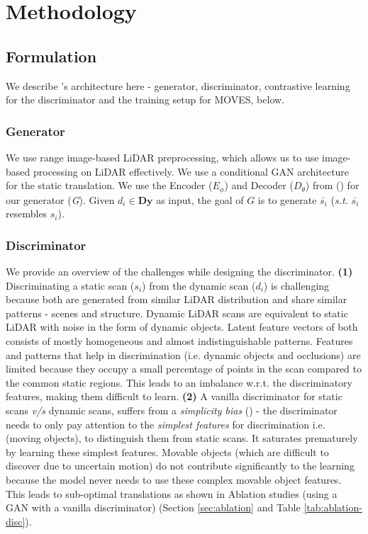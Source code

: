\section{Methodology}
\subsection{\dslr{} Formulation}
We describe \dslr{}'s architecture here - generator, discriminator, contrastive learning for the discriminator and the training setup for MOVES, below.
\subsubsection{Generator}
We use range image-based LiDAR preprocessing, which allows us to use image-based processing on LiDAR effectively. We use a conditional GAN architecture for the  static translation. We use the Encoder ($E_\phi$) and Decoder ($D_\theta$) from (\citet{caccia2018deep}) for our generator (\textit{G}). Given $d_i\in \textbf{Dy}$ as input, the goal of $G$ is to generate $\overline{s_i}$  (\textit{s.t.} $\overline{s_i}$ resembles $s_i$). 
\subsubsection{Discriminator}
\label{subsub-disc}
We provide an overview of the challenges while designing the discriminator. \textbf{(1)} Discriminating a static scan ($s_i$) from the dynamic scan ($d_i$) is challenging because both are generated from similar LiDAR distribution and share similar patterns - scenes and structure. Dynamic LiDAR scans are equivalent to static LiDAR with noise in the form of dynamic objects. Latent feature vectors of both consists of mostly homogeneous and almost indistinguishable patterns. Features and patterns that help in discrimination (i.e. dynamic objects and occlusions) are limited because they occupy a small percentage of points in the scan compared to the common static regions. This leads to an imbalance w.r.t. the discriminatory features, making them difficult to learn. \textbf{(2)} A vanilla discriminator for static scans \textit{v/s} dynamic scans, suffers from a \textit{simplicity bias} (\citet{shah2020pitfalls}) - the discriminator needs to only pay attention to the \textit{simplest features} for discrimination i.e. (moving objects), to distinguish them from static scans. It saturates prematurely by learning these simplest features. Movable objects (which are difficult to discover due to uncertain motion) do not contribute significantly to the learning because the model never needs to use these complex movable object features. This leads to  sub-optimal translations as shown in Ablation studies (using a GAN with a vanilla discriminator) (Section \ref{sec:ablation} and Table \ref{tab:ablation-disc}).

